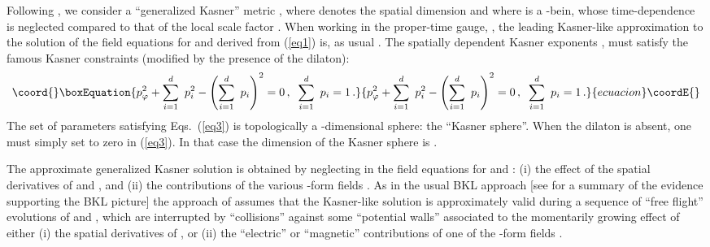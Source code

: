 \documentclass[a4paper,12pt]{article}
\begin{document}
Following \cite{BKL}, we consider a ``generalized Kasner'' metric
\coordHE{}, 
where \coordHE{} denotes the spatial dimension and where 
\coordHE{} is a \coordHE{}-bein, whose 
time-dependence is neglected compared to that of the local scale 
factor \coordHE{}. When working in the proper-time gauge, \coordHE{}, the leading Kasner-like approximation to the solution of the 
field equations for \coordHE{} and \myHighlight{$\varphi$}\coordHE{} derived from 
(\ref{eq1}) is, as usual \cite{BKL}
\coordHE{} . 
The spatially dependent Kasner exponents \coordHE{}, 
\coordHE{} must satisfy the famous Kasner constraints 
(modified by the presence of the dilaton):
\begin{equation}\coord{}\boxEquation{
p_{\varphi}^2 + \sum_{i=1}^d \ p_i^2 - \left(\sum_{i=1}^d \ p_i 
\right)^2 = 0 \, , \; \; 
\sum_{i=1}^d \ p_i = 1 \, . 
\label{eq3}
}{
p_{\varphi}^2 + \sum_{i=1}^d \ p_i^2 - \left(\sum_{i=1}^d \ p_i 
\right)^2 = 0 \, , \; \; 
\sum_{i=1}^d \ p_i = 1 \, . 
}{ecuacion}\coordE{}\end{equation}
The set of parameters satisfying Eqs.~(\ref{eq3}) is topologically
a \coordHE{}-dimensional sphere: the ``Kasner sphere''. When the 
dilaton is absent, one must simply set \coordHE{} to
zero in (\ref{eq3}).
In that case the dimension of the Kasner sphere is \coordHE{}.

The approximate generalized Kasner solution is obtained by neglecting 
in the field equations for \coordHE{} and \myHighlight{$\varphi$}\coordHE{}: (i) the 
effect of the spatial derivatives of \coordHE{} and \myHighlight{$\varphi$}\coordHE{}, and (ii) 
the contributions of the various \coordHE{}-form fields \coordHE{}.
As in the usual BKL approach [see \cite{bgimw} for a summary of the 
evidence supporting the BKL picture] the approach of 
\cite{dh1,dh2} assumes that the Kasner-like solution 
is approximately valid during a sequence of ``free 
flight'' evolutions of \coordHE{} and \myHighlight{$\varphi$}\coordHE{}, which are 
interrupted by ``collisions'' against some ``potential walls'' 
associated to the momentarily growing effect of either (i) the 
spatial derivatives of \coordHE{}, or (ii) the ``electric'' or 
``magnetic'' contributions of one of the \coordHE{}-form fields \coordHE{}. 
\end{document}
